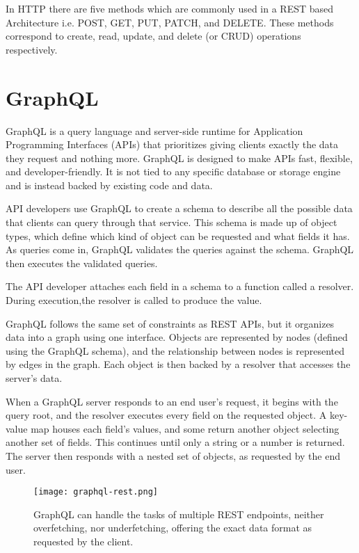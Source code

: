In HTTP there are five methods which are commonly used in a REST based Architecture 
i.e. POST, GET, PUT, PATCH, and DELETE. These methods correspond to create, read, 
update, and delete (or CRUD) operations respectively.~\cite{GeeksRestAPI}

\section{GraphQL}

GraphQL is a query language and server-side runtime for Application Programming Interfaces (APIs) 
that prioritizes giving clients exactly the data they request and nothing more. 
GraphQL is designed to make APIs fast, flexible, and developer-friendly. It is not tied 
to any specific database or storage engine and is instead backed by existing code and data.

API developers use GraphQL to create a schema to describe all the possible data that clients can query 
through that service. This schema is made up of object types, which define which kind of object can be
requested and what fields it has. As queries come in, GraphQL validates the queries against the schema. 
GraphQL then executes the validated queries.

The API developer attaches each field in a schema to a function called a resolver. 
During execution,the resolver is called to produce the value.~\cite{WhatisGraphQL}

GraphQL follows the same set of constraints as REST APIs, but it organizes data into a 
graph using one interface. Objects are represented by nodes (defined using the GraphQL schema), 
and the relationship between nodes is represented by edges in the graph. Each object is then backed 
by a resolver that accesses the server’s data.

When a GraphQL server responds to an end user’s request, it begins with the query root,
and the resolver executes every field on the requested object. A key-value map houses each field’s
values, and some return another object selecting another set of fields. This continues until only a 
string or a number is returned. The server then responds with a nested set of objects, as requested by 
the end user.~\cite{RubrikGraphQL}

\begin{figure}
    \begin{center}
        \texttt{[image: graphql-rest.png]}
    \end{center}
    \caption{GraphQL can handle the tasks of multiple REST endpoints, 
    neither overfetching, nor underfetching,
    offering the exact data format as requested by the client.}
    \label{fig:graphql}
\end{figure}
  
